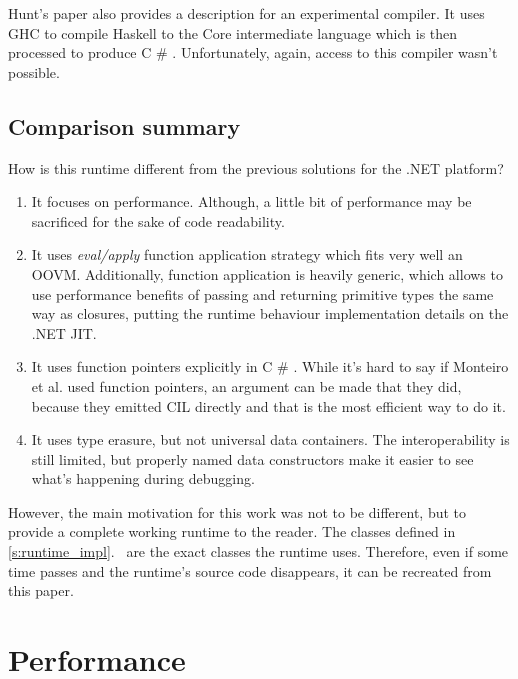\documentclass[en]{pracamgr}
\newcommand{\shrp}{%
  {\fontfamily{ppl}\selectfont\#%
  }}
\newcommand{\myref}[1]{\ref{#1}.~\textit{\nameref{#1}}}
\begin{document}
Hunt's paper also provides a description for an experimental
compiler. It uses GHC to compile Haskell to the Core
intermediate language which is then processed to produce C\shrp{}.
Unfortunately, again, access to this compiler wasn't possible.

\section{Comparison summary}

How is this runtime different from the previous solutions for the .NET platform?

\begin{enumerate}
    \item It focuses on performance. Although, a little bit of performance
            may be sacrificed for the sake of code readability.
    \item It uses \textit{eval/apply} function application strategy
            which fits very well an OOVM. Additionally, function application
            is heavily generic, which allows to use performance benefits of
            passing and returning primitive types the same way as closures,
            putting the runtime behaviour implementation details on the .NET JIT.
    \item It uses function pointers explicitly in C\shrp{}. While it's hard to
            say if Monteiro et al. used function pointers, an argument can be made
            that they did, because they emitted CIL directly and that is the most
            efficient way to do it.
    \item It uses type erasure, but not universal data containers. The interoperability
            is still limited, but properly named data constructors make it
            easier to see what's happening during debugging.
\end{enumerate}

However, the main motivation for this work was not to be different, but
to provide a complete working runtime to the reader. The classes defined
in \myref{s:runtime_impl} are the exact classes the runtime uses. Therefore,
even if some time passes and the runtime's source code disappears, it can be recreated
from this paper.

\chapter{Performance}\label{r:perf}
\end{document}
